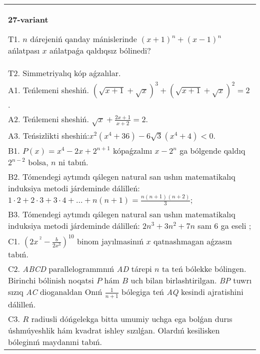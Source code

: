 \documentclass{article}
\begin{document}
\begin{tabular}{m{17cm}}
\textbf{27-variant}
\newline

T1. \(n\) dárejeniń qanday mánislerinde \((x + 1)^{n} + (x - 1)^{n}\) ańlatpası \(x\) ańlatpaǵa qaldıqsız bólinedi? \\
T2. Simmetriyalıq kóp aǵzalılar. \\
A1. Teńlemeni sheshiń. \((\sqrt{x + 1} + \sqrt{x})^{3} + (\sqrt{x + 1} + \sqrt{x})^{2} = 2\). \\
A2. Teńlemeni sheshiń. \(\sqrt{x} + \frac{2x + 1}{x + 2} = 2\). \\
A3. Teńsizlikti sheshiń:\(x^{2}\left( x^{4} + 36 \right) - 6\sqrt{3}\left( x^{4} + 4 \right) < 0\). \\
B1. \(P(x) = x^{4} - 2x + 2^{n + 1}\) kópaǵzalını \(x - 2^{n}\) ga bólgende qaldıq \(2^{n - 2}\) bolsa, \(n\) ni tabıń. \\
B2. Tómendegi aytımdı qálegen natural san ushın matematikalıq induksiya metodi járdeminde dálilleń: \(1 \cdot 2 + 2 \cdot 3 + 3 \cdot 4 + ... + n(n + 1) = \frac{n(n + 1)(n + 2)}{3}\); \\
B3. Tómendegi aytımdı qálegen natural san ushın matematikalıq induksiya metodi járdeminde dálilleń: \(2n^{3} + 3n^{2} + 7n\) sanı 6 ga eseli ; \\
C1. \(\left( 2x^{\ ^{2}} - \frac{b}{2x^{3}} \right)^{10}\) binom jayılmasinıń \(x\) qatnashmagan aǵzasın tabıń. \\
C2. \emph{ABCD} parallelogrammnıń \emph{AD} tárepi \(n\) ta teń bólekke bólingen. Birinchi bólinish noqatsi \(P\) hám \(B\) uch bilan birlashtirilgan. \emph{BP} tuwrı sızıq \emph{AC} dioganaldan Onıń \(\frac{1}{n + 1}\) bólegiga teń \emph{AQ} kesindi ajratishini dálilleń. \\
C3. \(R\) radiusli dóńgelekga bitta umumiy uchga ega bolǵan durıs úshmúyeshlik hám kvadrat ishley sızılǵan. Olardıń kesilisken bóleginıń maydanıni tabıń. \\

\end{tabular}
\vspace{1cm}
\end{document}

